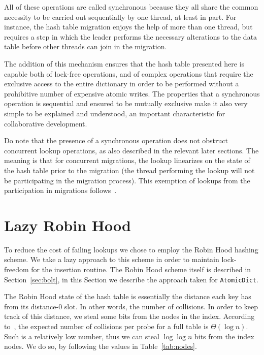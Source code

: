 All of these operations are called synchronous because they all share the common necessity to be carried out sequentially by one thread, at least in part.
For instance, the hash table migration enjoys the help of more than one thread, but requires a step in which the leader performs the necessary alterations to the data table before other threads can join in the migration.

The addition of this mechanism ensures that the hash table presented here is capable both of lock-free operations, and of complex operations that require the exclusive access to the entire dictionary in order to be performed without a prohibitive number of expensive atomic writes.
The properties that a synchronous operation is sequential and ensured to be mutually exclusive make it also very simple to be explained and understood, an important characteristic for collaborative development.

Do note that the presence of a synchronous operation does not obstruct concurrent lookup operations, as also described in the relevant later sections.
The meaning is that for concurrent migrations, the lookup linearizes on the state of the hash table prior to the migration (the thread performing the lookup will not be participating in the migration process).
This exemption of lookups from the participation in migrations follows~\cite[\S5.3.2, Preventing Concurrent Updates to Ensure Consistency]{maier}.


\section{Lazy Robin Hood}\label{sec:lazy-robin-hood}

To reduce the cost of failing lookups we chose to employ the Robin Hood hashing scheme.
We take a lazy approach to this scheme in order to maintain lock-freedom for the insertion routine.
The Robin Hood scheme itself is described in Section~\ref{sec:bolt}, in this Section we describe the approach taken for \texttt{AtomicDict}.

The Robin Hood state of the hash table is essentially the distance each key has from its distance-0 slot.
In other words, the number of collisions.
In order to keep track of this distance, we steal some bits from the nodes in the index.
According to~\cite[Corollary to Theorem~3]{robin-hood}, the expected number of collisions per probe for a full table is $\Theta(\log n)$.
Such is a relatively low number, thus we can steal $\log \log n$ bits from the index nodes.
We do so, by following the values in Table~\ref{tab:nodes}.

